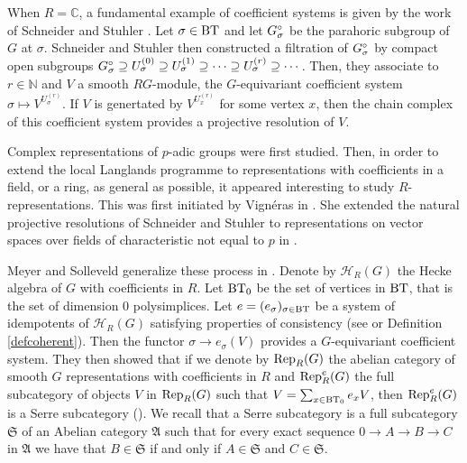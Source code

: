 \documentclass[a4paper,10pt]{amsart}
\begin{document}
\medskip


When $R=\mathbb{C}$, a fundamental example of coefficient systems is given by the work of Schneider and Stuhler \cite{SchneiderStuhler}. Let $\sigma \in \bt$ and let $G_{\sigma}^{\circ}$ be the parahoric subgroup of $G$ at $\sigma$. Schneider and Stuhler then constructed a filtration of $G_{\sigma}^{\circ}$ by compact open subgroups $G_{\sigma}^{\circ} \supseteq U_{\sigma}^{(0)} \supseteq U_{\sigma}^{(1)} \supseteq \cdots \supseteq U_{\sigma}^{(r)} \supseteq \cdots$. Then, they associate to $r\in \mathbb{N}$ and $V$ a smooth $RG$-module, the $G$-equivariant coefficient system $\sigma \mapsto V^{U_{\sigma}^{(r)}}$. If $V$ is genertated by $V^{U_{x}^{(r)}}$ for some vertex $x$, then the chain complex of this coefficient system provides a projective resolution of $V$.

\medskip

Complex representations of $p$-adic groups were first studied. Then, in order to extend the local Langlands programme to representations with coefficients in a field, or a ring, as general as possible, it appeared interesting to study $R$-representations. This was first initiated by Vignéras in \cite{vignerasmod}. She extended the natural projective resolutions of Schneider and Stuhler to representations on vector spaces over fields of characteristic not equal to $p$ in \cite{vignsheves}.

\medskip

Meyer and Solleveld generalize these process in \cite{meyer_resolutions_2010}. Denote by $\mathcal{H}_{R}(G)$ the Hecke algebra of $G$ with coefficients in $R$. Let $\bts$ be the set of vertices in $\bt$, that is the set of dimension 0 polysimplices.  Let $e=(e_{\sigma})_{\sigma\in \bt}$ be a system of idempotents of $\mathcal{H}_{R}(G)$ satisfying properties of consistency (see \cite[Def 2.1]{meyer_resolutions_2010} or Definition \ref{defcoherent}). Then the functor $\sigma \to e_{\sigma}(V)$ provides a $G$-equivariant coefficient system. They then showed that if we denote by $\rep[R]{G}$ the abelian category of smooth $G$ representations with coefficients in $R$ and $\rep[R][e]{G}$ the full subcategory of objects $V$ in $\rep[R]{G}$ such that $V=\sum_{x\in \bts}e_{x}V$, then $\rep[R][e]{G}$ is a Serre subcategory (\cite[Thm 3.1]{meyer_resolutions_2010}). We recall that a Serre subcategory is a full subcategory $\mathfrak{S}$ of an Abelian category $\mathfrak{A}$ such that for every exact sequence $0 \to A \to B \to C$ in $\mathfrak{A}$ we have that $B \in \mathfrak{S}$ if and only if $A \in \mathfrak{S}$ and $C \in \mathfrak{S}$.
\end{document}
